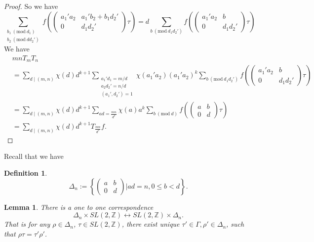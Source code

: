 \documentclass{article}
\newtheorem{definition}[theorem]{Definition}
\newtheorem{lemma}[theorem]{Lemma}
\newcommand{\Mod}[1]{\ (\mathrm{mod}\ #1)}
\begin{document}
\begin{proof}
    So we have \begin{equation*}
        \sum_{\substack{b_1\Mod{d_1}\\b_2\Mod{d d_2'}}}f\left(\begin{pmatrix}
            a_1'a_2&a_1'b_2+b_1d_2'\\
            0&d_1d_2'
        \end{pmatrix}\tau\right)=d\sum_{b \Mod{d_1d_2'}}f\left(\begin{pmatrix}
            a_1'a_2&b\\
            0&d_1d_2'
        \end{pmatrix}\tau\right)
    \end{equation*}
    We have
    \begin{equation*}
        \begin{aligned}
        &mnT_mT_n\\
        &=\sum_{d\mid (m,n)}\chi(d)d^{k+1}\sum_{\substack{a_1'd_1=m/d\\a_2d_2'=n/d\\(a_1',d_2')=1}}\chi(a_1'a_2)(a_1'a_2)^k
        \sum_{b \Mod{d_1d_2'}}f\left(\begin{pmatrix}
            a_1'a_2&b\\
            0&d_1d_2'
        \end{pmatrix}\tau\right)\\
        &=\sum_{d\mid (m,n)}\chi(d)d^{k+1}\sum_{ad=\frac{mn}{d^2}}\chi(a)a^k\sum_{b\Mod{d}}f\left(\begin{pmatrix}
            a&b\\
            0&d
        \end{pmatrix}\tau\right)\\
        &=\sum_{d\mid(m,n)}\chi(d)d^{k+1}T_{\frac{mn}{d^2}}f.
        \end{aligned}
    \end{equation*}
\end{proof}
Recall that we have 
\begin{definition}
    \[\Delta_n:=\left\{\begin{pmatrix}
        a&b\\
        0&d
    \end{pmatrix}\big| ad=n, 0\leq b < d\right\}.\]
\end{definition}
\begin{lemma}\label{lem 4}
    There is a one to one correspondence \[\Delta_n\times SL(2,\mathbb{Z})\leftrightarrow  SL(2,\mathbb{Z}) \times \Delta_n.\] That is for any $\rho \in \Delta_n$, $\tau \in SL(2,\mathbb{Z})$, there exist unique $\tau'\in \Gamma,\rho' \in \Delta_n$, such that $\rho \tau =\tau' \rho'$.
\end{lemma}
\end{document}
